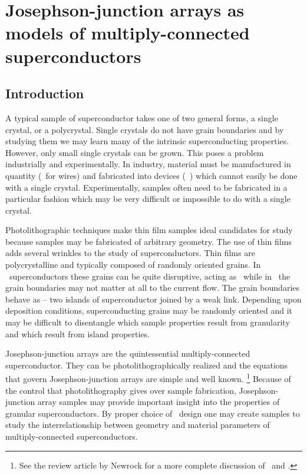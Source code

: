 
\chapter{Josephson-junction arrays as models of multiply-connected 
superconductors}
\label{chap:jjarray}

\section{Introduction}
\label{sec:jjarray_intro}

A typical sample of superconductor takes one of two general forms,
a single crystal, or a
polycrystal. Single crystals 
do not have grain boundaries
and by studying them we may learn many of the intrinsic superconducting 
properties.
However, only small single crystals can be grown.
This poses a problem industrially and experimentally. 
In industry, material must be manufactured in quantity
(\eg\ for wires) and fabricated
into devices (\eg\ \jjsnoun)
which cannot easily be done with a single crystal. Experimentally,
samples often need to be fabricated in a particular fashion
which may be
very difficult or impossible to do with a
single crystal.

Photo\-litho\-graphic
techniques make thin film samples ideal candidates for study because
samples may be fabricated of arbitrary geometry.
The use
of thin films adds several wrinkles to the study of superconductors. 
Thin films are polycrystalline and typically composed of randomly oriented
grains. 
In \hightc\ superconductors these grains can be quite disruptive, 
acting as \jjsnoun\ while in \lowtc\ the grain boundaries may not 
matter at all to the current flow. 
The grain boundaries behave as \jjsnoun --  two islands of 
superconductor joined by a weak link. Depending upon deposition 
conditions, superconducting grains may be randomly oriented and it may be
difficult to disentangle which sample properties result from granularity
and which result from island properties. 

Josephson-junction arrays are the 
quintessential multiply-connected superconductor. They 
can be photo\-lith\-o\-graph\-i\-cally realized and the equations 
that govern
Josephson-junction arrays are simple and well known.%
\footnote{See the review article by Newrock \etal\cite{newrock_ssp_54_263_2000}
for a more complete discussion of \jjsnoun\ and \jjas.}
Because of the control that photolithography gives
over sample fabrication,
Josephson-junction array samples may provide
important insight into the properties of granular superconductors.
By proper choice of \jja\ design one may create samples
to study the interrelationship between geometry and material
parameters of multiply-connected superconductors.

